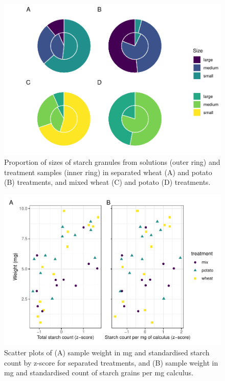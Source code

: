 \documentclass[utf8]{frontiers/frontiersSCNS}
\begin{document}
\begin{figure}[H]

{\centering \includegraphics{../figures/ratio-plots-1} 

}

\caption{Proportion of sizes of starch granules from solutions (outer ring) and treatment samples (inner ring) in separated wheat (A) and potato (B) treatments, and mixed wheat (C) and potato (D) treatments.}\label{fig:ratio-plots}
\end{figure}

\begin{figure}[H]

{\centering \includegraphics{../figures/cor-plot-1} 

}

\caption{Scatter plots of (A) sample weight in mg and standardised starch count by z-score for separated treatments, and (B) sample weight in mg and standardised count of starch grains per mg calculus.}\label{fig:cor-plot}
\end{figure}
\end{document}
